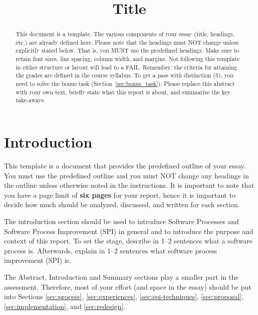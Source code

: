 \documentclass[conference]{IEEEtran}
\begin{document}
\title{Title}

\author{
}

\maketitle

\begin{abstract}
This document is a template. The various components of your essay (title, headings, etc.) are already defined here. Please note that the headings must NOT change unless explicitly stated below. That is, you MUST use the predefined headings. Make sure to retain font sizes, line spacing, column width, and margins. Not following this template in either structure or layout will lead to a FAIL. Remember: the criteria for attaining the grades are defined in the course syllabus. To get a pass with distinction (5), you need to solve the bonus task (Section~\ref{sec:bonus_task}). Please replace this abstract with your own text, briefly state what this report is about, and summarize the key take-aways.
\end{abstract}

\section{Introduction}
This template is a document that provides the predefined outline of your essay. You must use the predefined outline and you must NOT change any headings in the outline unless otherwise noted in the instructions. It is important to note that you have a page limit of \textbf{six pages} for your report, hence it is important to decide how much should be analyzed, discussed, and written for each section.

The introduction section should be used to introduce Software Processes and Software Process Improvement (SPI) in general and to introduce the purpose and context of this report.
To set the stage, describe in 1--2 sentences what a software process is.
Afterwards, explain in 1--2 sentences what software process improvement (SPI) is.

The Abstract, Introduction and Summary sections play a smaller part in the assessment. Therefore, most of your effort (and space in the essay) should be put into Sections \ref{sec:process}, \ref{sec:experiences}, \ref{sec:spi-techniques}, \ref{sec:proposal}, \ref{sec:implementation}, and \ref{sec:redesign}.
\end{document}
